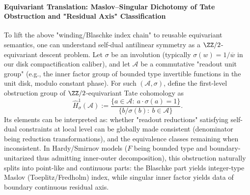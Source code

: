 \paragraph{Equivariant Translation: Maslov–Singular Dichotomy of Tate Obstruction and "Residual Axis" Classification}\label{par:selfdual-tate-maslov-splitting}
To lift the above "winding/Blaschke index chain" to reusable equivariant semantics, one can understand self-dual antilinear symmetry as a \(\ZZ/2\)-equivariant descent problem.
Let \(\sigma\) be an involution (typically \(\sigma(w)=1/\overline w\) in our disk compactification caliber), and let \(\mathcal{A}\) be a commutative "readout unit group" (e.g., the inner factor group of bounded type invertible functions in the unit disk, modulo constant phase).
For such \((\mathcal{A},\sigma)\), define the first-level obstruction group of \(\ZZ/2\)-equivariant Tate cohomology as
\[
\widehat H^1_{\sigma}(\mathcal{A})
:=
\frac{\{a\in\mathcal{A}:\ a\cdot\sigma(a)=1\}}{\{b/\sigma(b):\ b\in\mathcal{A}\}}.
\]
Its elements can be interpreted as: whether "readout reductions" satisfying self-dual constraints at local level can be globally made consistent (denominator being reduction transformations), and the equivalence classes remaining when inconsistent.
In Hardy/Smirnov models (\(F\) being bounded type and boundary-unitarized thus admitting inner-outer decomposition), this obstruction naturally splits into point-like and continuous parts: the Blaschke part yields integer-type Maslov (Toeplitz/Fredholm) index, while singular inner factor yields data of boundary continuous residual axis.

